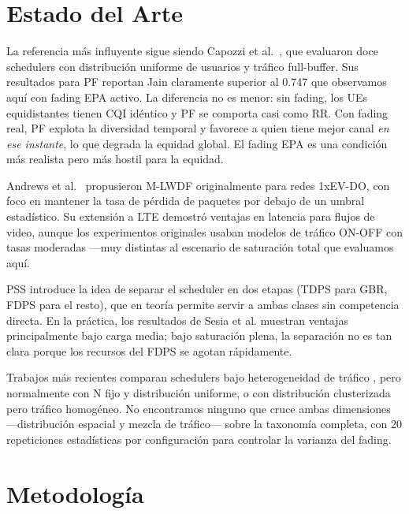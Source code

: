 \documentclass[conference]{IEEEtran}
\begin{document}
\section{Estado del Arte}
\label{sec:arte}

La referencia más influyente sigue siendo Capozzi et al.~\cite{capozzi2012}, que
evaluaron doce schedulers con distribución uniforme de usuarios y tráfico full-buffer.
Sus resultados para PF reportan Jain claramente superior al 0.747 que observamos
aquí con fading EPA activo. La diferencia no es menor: sin fading, los UEs
equidistantes tienen CQI idéntico y PF se comporta casi como RR. Con fading real,
PF explota la diversidad temporal y favorece a quien tiene mejor canal \emph{en ese
instante}, lo que degrada la equidad global. El fading EPA es una condición más
realista pero más hostil para la equidad.

Andrews et al.~\cite{mlwdf2001} propusieron M-LWDF originalmente para redes 1xEV-DO,
con foco en mantener la tasa de pérdida de paquetes por debajo de un umbral estadístico.
Su extensión a LTE demostró ventajas en latencia para flujos de video, aunque los
experimentos originales usaban modelos de tráfico ON-OFF con tasas moderadas ---muy
distintas al escenario de saturación total que evaluamos aquí.

PSS \cite{pss2006} introduce la idea de separar el scheduler en dos etapas (TDPS para
GBR, FDPS para el resto), que en teoría permite servir a ambas clases sin competencia
directa. En la práctica, los resultados de Sesia et al. muestran ventajas principalmente
bajo carga media; bajo saturación plena, la separación no es tan clara porque los
recursos del FDPS se agotan rápidamente.

Trabajos más recientes comparan schedulers bajo heterogeneidad de tráfico
\cite{tta2007,bet2004}, pero normalmente con N fijo y distribución uniforme, o con
distribución clusterizada pero tráfico homogéneo. No encontramos ninguno que cruce
ambas dimensiones ---distribución espacial y mezcla de tráfico--- sobre la taxonomía
completa, con 20 repeticiones estadísticas por configuración para controlar la
varianza del fading.

\section{Metodología}
\label{sec:metodo}
\end{document}
